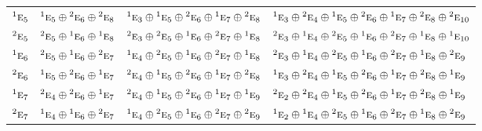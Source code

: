 \documentclass[10pt,a4paper]{article}
\numberwithin{equation}{section}
\newcommand{\irr}[1]{\text{\normalfont\scshape #1}}
\newcommand{\conjpair}[1]{{}^{#1}}
\begin{document}
{\begin{longtable}{@{}llll@{}}
$\conjpair{1}\irr{e}_{5}$ & $\conjpair{1}\irr{e}_{5}\oplus \conjpair{2}\irr{e}_{6}\oplus \conjpair{2}\irr{e}_{8}$ & $\conjpair{1}\irr{e}_{3}\oplus \conjpair{1}\irr{e}_{5}\oplus \conjpair{2}\irr{e}_{6}\oplus \conjpair{1}\irr{e}_{7}\oplus \conjpair{2}\irr{e}_{8}$ & $\conjpair{1}\irr{e}_{3}\oplus \conjpair{2}\irr{e}_{4}\oplus \conjpair{1}\irr{e}_{5}\oplus \conjpair{2}\irr{e}_{6}\oplus \conjpair{1}\irr{e}_{7}\oplus \conjpair{2}\irr{e}_{8}\oplus \conjpair{2}\irr{e}_{10}$\\
$\conjpair{2}\irr{e}_{5}$ & $\conjpair{2}\irr{e}_{5}\oplus \conjpair{1}\irr{e}_{6}\oplus \conjpair{1}\irr{e}_{8}$ & $\conjpair{2}\irr{e}_{3}\oplus \conjpair{2}\irr{e}_{5}\oplus \conjpair{1}\irr{e}_{6}\oplus \conjpair{2}\irr{e}_{7}\oplus \conjpair{1}\irr{e}_{8}$ & $\conjpair{2}\irr{e}_{3}\oplus \conjpair{1}\irr{e}_{4}\oplus \conjpair{2}\irr{e}_{5}\oplus \conjpair{1}\irr{e}_{6}\oplus \conjpair{2}\irr{e}_{7}\oplus \conjpair{1}\irr{e}_{8}\oplus \conjpair{1}\irr{e}_{10}$\\
$\conjpair{1}\irr{e}_{6}$ & $\conjpair{2}\irr{e}_{5}\oplus \conjpair{1}\irr{e}_{6}\oplus \conjpair{2}\irr{e}_{7}$ & $\conjpair{1}\irr{e}_{4}\oplus \conjpair{2}\irr{e}_{5}\oplus \conjpair{1}\irr{e}_{6}\oplus \conjpair{2}\irr{e}_{7}\oplus \conjpair{1}\irr{e}_{8}$ & $\conjpair{2}\irr{e}_{3}\oplus \conjpair{1}\irr{e}_{4}\oplus \conjpair{2}\irr{e}_{5}\oplus \conjpair{1}\irr{e}_{6}\oplus \conjpair{2}\irr{e}_{7}\oplus \conjpair{1}\irr{e}_{8}\oplus \conjpair{2}\irr{e}_{9}$\\
$\conjpair{2}\irr{e}_{6}$ & $\conjpair{1}\irr{e}_{5}\oplus \conjpair{2}\irr{e}_{6}\oplus \conjpair{1}\irr{e}_{7}$ & $\conjpair{2}\irr{e}_{4}\oplus \conjpair{1}\irr{e}_{5}\oplus \conjpair{2}\irr{e}_{6}\oplus \conjpair{1}\irr{e}_{7}\oplus \conjpair{2}\irr{e}_{8}$ & $\conjpair{1}\irr{e}_{3}\oplus \conjpair{2}\irr{e}_{4}\oplus \conjpair{1}\irr{e}_{5}\oplus \conjpair{2}\irr{e}_{6}\oplus \conjpair{1}\irr{e}_{7}\oplus \conjpair{2}\irr{e}_{8}\oplus \conjpair{1}\irr{e}_{9}$\\
$\conjpair{1}\irr{e}_{7}$ & $\conjpair{2}\irr{e}_{4}\oplus \conjpair{2}\irr{e}_{6}\oplus \conjpair{1}\irr{e}_{7}$ & $\conjpair{2}\irr{e}_{4}\oplus \conjpair{1}\irr{e}_{5}\oplus \conjpair{2}\irr{e}_{6}\oplus \conjpair{1}\irr{e}_{7}\oplus \conjpair{1}\irr{e}_{9}$ & $\conjpair{2}\irr{e}_{2}\oplus \conjpair{2}\irr{e}_{4}\oplus \conjpair{1}\irr{e}_{5}\oplus \conjpair{2}\irr{e}_{6}\oplus \conjpair{1}\irr{e}_{7}\oplus \conjpair{2}\irr{e}_{8}\oplus \conjpair{1}\irr{e}_{9}$\\
$\conjpair{2}\irr{e}_{7}$ & $\conjpair{1}\irr{e}_{4}\oplus \conjpair{1}\irr{e}_{6}\oplus \conjpair{2}\irr{e}_{7}$ & $\conjpair{1}\irr{e}_{4}\oplus \conjpair{2}\irr{e}_{5}\oplus \conjpair{1}\irr{e}_{6}\oplus \conjpair{2}\irr{e}_{7}\oplus \conjpair{2}\irr{e}_{9}$ & $\conjpair{1}\irr{e}_{2}\oplus \conjpair{1}\irr{e}_{4}\oplus \conjpair{2}\irr{e}_{5}\oplus \conjpair{1}\irr{e}_{6}\oplus \conjpair{2}\irr{e}_{7}\oplus \conjpair{1}\irr{e}_{8}\oplus \conjpair{2}\irr{e}_{9}$\\

\end{longtable}}
\end{document}

